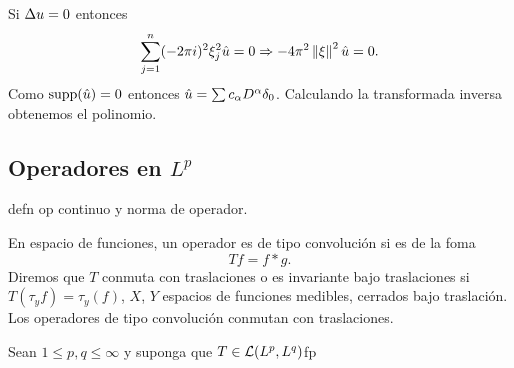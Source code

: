 \documentclass[12pt]{memoir}
\begin{document}
\begin{ptcbp}
  Si $\Delta u=0$ entonces 
  $$\sum_{j=1}^n(-2\pi i)^2\xi_j^2\hat{u}=0\Rightarrow -4\pi^2\left\|\xi\right\|^2\hat{u}=0.$$
  Como $\operatorname{supp}(\hat{u})=0$ entonces $\hat{u}=\sum c_\alpha D^\alpha \delta_0$. Calculando la transformada inversa obtenemos el polinomio.
\end{ptcbp}

\subsection{Operadores en $L^p$}

defn op continuo y norma de operador.\par 
En espacio de funciones, un operador es de tipo convolución si es de la foma $$Tf = f\ast g.$$
Diremos que $T$ conmuta con traslaciones o es invariante bajo traslaciones si $T(\tau_yf)=\tau_y(f)$, $X$, $Y$ espacios de funciones medibles, cerrados bajo traslación. Los operadores de tipo convolución conmutan con traslaciones.

\begin{Th}
  Sean $1\leq p,q\leq \infty$ y suponga que $T\in\mathcal{L}(L^p,L^q)$fp
\end{Th}
\ifx\nextra\undefined
\printindex
\else\fi
\nocite{*}


\end{document}

